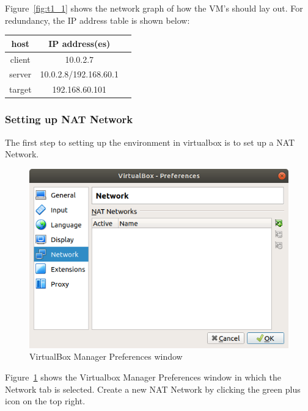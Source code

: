\documentclass[12pt]{article}
\begin{document}
Figure~\ref{fig:t1_1} shows the network graph of how the VM's should lay out. For redundancy, the IP address table is shown below:

\begin{center}
\begin{tabular}{ |c|c|c| } 
 \hline
 host & IP address(es) \\ 
 \hline
 client & 10.0.2.7  \\ 
 server & 10.0.2.8/192.168.60.1  \\ 
 target & 192.168.60.101 \\
 \hline
\end{tabular}
\end{center}

\subsubsection{Setting up NAT Network}
The first step to setting up the environment in virtualbox is to set up a NAT Network.


\begin{figure}[H]
    \begin{center}
        \includegraphics[scale=0.5]{NATNetwork_1.png}
    \end{center}{}
    \caption{VirtualBox Manager Preferences window}
    \label{fig:t1_2}
\end{figure}

Figure~\ref{fig:t1_2} shows the Virtualbox Manager Preferences window in which the Network tab is selected. Create a new NAT Network by clicking the green plus icon on the top right. 
\end{document}
